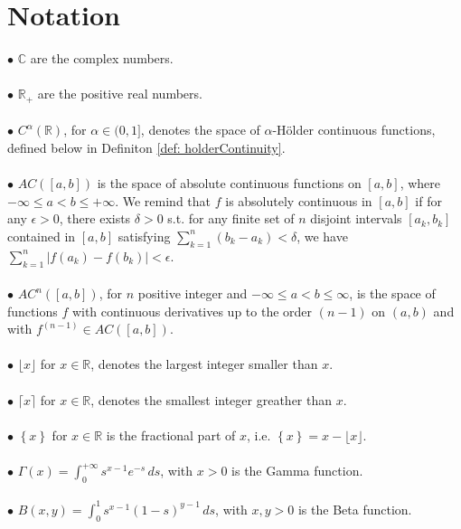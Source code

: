\documentclass[a4paper,italian,11pt]{book}
\theoremstyle{plain}
\theoremstyle{remark}
\theoremstyle{plain}
\begin{document}
\newpage

\section*{Notation}

\noindent 
$\bullet$ $\mathbb{C}$ are the complex numbers.
\\
\\
\noindent
$\bullet$ $\mathbb{R}_+$ are the positive real numbers.
\\
\\
\noindent
$\bullet$ $C^\alpha (\mathbb{R})$, for $\alpha \in (0,1]$, denotes the space of $\alpha$-Hölder continuous functions, defined below in Definiton \ref{def: holderContinuity}.
\\
\\
\noindent
$\bullet$ $AC([a,b])$ is the space of absolute continuous functions on $[a,b]$, where $-\infty \le a < b \le +\infty$. We remind that $f$ is absolutely continuous in $[a,b]$ if for any $\epsilon >0$, there exists $\delta >0$ s.t. for any finite set of $n$ disjoint intervals $[a_k,b_k]$ contained in $[a,b]$ satisfying $\sum_{k=1}^n (b_k-a_k) <\delta$, we have $\sum_{k=1}^n |f(a_k)-f(b_k)|<\epsilon$.
\\
\\
\noindent
$\bullet$ $AC^n([a,b])$, for $n$ positive integer and $-\infty \le a < b \le \infty$, is the space of functions $f$ with continuous derivatives up to the order $(n-1)$ on $(a,b)$ and with $f^{(n-1)}\in AC([a,b]).$
\\
\\
\noindent
$\bullet$ $\lfloor x \rfloor $ for $x \in \mathbb{R}$, denotes the largest integer smaller than $x$.
\\
\\
\noindent
$\bullet$ $\lceil x \rceil$ for $x \in \mathbb{R}$, denotes the smallest integer greather than $x$.
\\
\\
\noindent
$\bullet$ $\left\{x \right\}$ for $x \in \mathbb{R}$ is the fractional part of $x$, i.e. $\left\{ x \right\} = x-\lfloor x \rfloor$.
\\
\\
\noindent
$\bullet$ $\Gamma(x) = \int_0^{+\infty}s^{x-1}e^{-s}\, ds$, with $x>0$ is the Gamma function.
\\
\\
\noindent
$\bullet$ $B(x,y) = \int_0^1 s^{x-1}(1-s)^{y-1} \, ds$, with $x,y>0$ is the Beta function.
\end{document}
